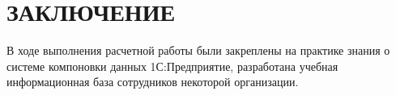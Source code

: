 \section*{ЗАКЛЮЧЕНИЕ}

В ходе выполнения расчетной работы были закреплены на практике знания
о системе компоновки данных 1С:Предприятие,
разработана учебная информационная база сотрудников некоторой организации.